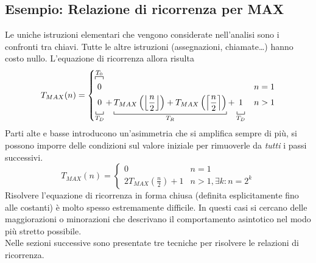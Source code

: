 \subsection{Esempio: Relazione di ricorrenza per MAX}
Le uniche istruzioni elementari che vengono considerate nell'analisi sono i confronti tra chiavi. Tutte le altre istruzioni (assegnazioni, chiamate\ldots) hanno costo nullo. L'equazione di ricorrenza allora risulta
\[
    T_{MAX}(n) = 
    \begin{cases} 
        \overbracket[0.5pt]{
            \vphantom{\frac{n}{2}}
            \;0\: 
        }^\text{$T_0$}
        &  n = 1 \\
        \underbracket[0.5pt]{
            \vphantom{\frac{n}{2}}
            \:0\:
        }_\text{$T_D$}
        + 
        \underbracket[0.5pt]{
            T_{MAX} \left( \left\lfloor \frac{n}{2} \right\rfloor \right) 
            + T_{MAX} \left( \left\lceil \frac{n}{2} \right\rceil \right)
        }_\text{$T_R$}
        + 
        \underbracket[0.5pt]{
            \vphantom{\frac{n}{2}}
            \:1\:
        }_\text{$T_D$} 
        & n > 1
    \end{cases}
\]
Parti alte e basse introducono un'asimmetria che si amplifica sempre di più, si possono imporre delle condizioni sul valore iniziale per rimuoverle da \textit{tutti} i passi successivi.
\[
    T_{MAX}(n) = 
    \begin{cases} 
        0      &  n = 1 \\
        2 T_{MAX} \left( \frac{n}{2} \right) + 1 & n > 1, \exists k : n=2^k
    \end{cases}
\]
Risolvere l'equazione di ricorrenza in forma chiusa (definita esplicitamente fino alle costanti) è molto spesso estremamente difficile. In questi casi si cercano delle maggiorazioni o minorazioni che descrivano il comportamento asintotico nel modo più stretto possibile.\\
Nelle sezioni successive sono presentate tre tecniche per risolvere le relazioni di ricorrenza.

